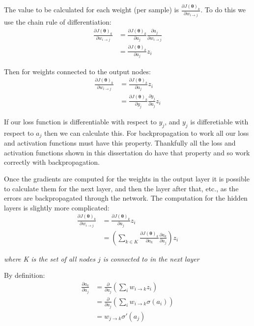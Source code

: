 \documentclass[12pt,a4paper,twoside,openright]{report}
\renewcommand{\vec}[1]{\bm{#1}}
\begin{document}
The value to be calculated for each weight (per sample) is $\frac{\partial J(\vec{\theta})_k}{\partial w_{i \to j}}$. To do this we use the chain rule
of differentiation:
\begin{align}
  \frac{\partial J(\vec{\theta})_k}{\partial w_{i \to j}} & = \frac{\partial J(\vec{\theta})_k}{\partial a_j} \frac{\partial a_j}{\partial w_{i \to j}} \\
  & = \frac{\partial J(\vec{\theta})_k}{\partial a_j} z_i
\end{align}

Then for weights connected to the output nodes:
\begin{align}
  \frac{\partial J(\vec{\theta})_k}{\partial w_{i \to j}} & = \frac{\partial J(\vec{\theta})_k}{\partial a_j} z_i \\
  & = \frac{\partial J(\vec{\theta})_k}{\partial y_j} \frac{\partial y_j}{\partial a_j} z_i
\end{align}

If our loss function is differentiable with respect to $y_j$, and $y_j$ is differetiable with respect to $a_j$ then we can calculate this.  
For backpropagation to work all our loss and activation functions must have this property. Thankfully all the loss and activation functions 
shown in this dissertation do have that property and so work correctly with backpropagation.

Once the gradients are computed for the weights in the output layer it is possible to calculate them for the next layer, and then the
layer after that, etc., as the errors are backpropagated through the network. The computation for the hidden layers is slightly more 
complicated:
\begin{align}
  \frac{\partial J(\vec{\theta})_k}{\partial w_{i \to j}} & = \frac{\partial J(\vec{\theta})_k}{\partial a_j} z_i \\
  & = \left( \sum_{k \in K} \frac{\partial J(\vec{\theta})_k}{\partial a_k} \frac{\partial a_k}{\partial a_j} \right) z_i
\end{align}
\begin{center}
  \textit{where K is the set of all nodes $j$ is connected to in the next layer}
\end{center}

By definition:
\begin{align}
  \frac{\partial a_k}{\partial a_j} & = \frac{\partial}{\partial a_j} \left( \sum_{i} w_{i \to k} z_i \right) \\
  & = \frac{\partial}{\partial a_j} \left( \sum_{i} w_{i \to k} \sigma(a_i) \right) \\
  & = w_{j \to k} \sigma'(a_j)
\end{align}
\end{document}

